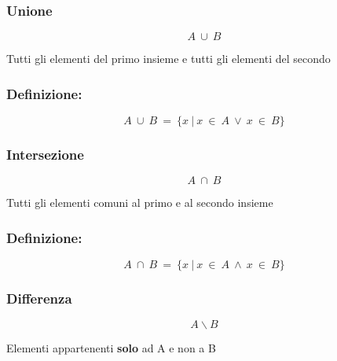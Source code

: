 \documentclass{article}
\begin{document}
    \subsubsection{Unione}
        \begin{LARGE}
            \begin{equation*}
                A\ \cup\ B
            \end{equation*}
        \end{LARGE}
        Tutti gli elementi del primo insieme e tutti gli elementi del secondo\newline
        
        \subsubsection*{Definizione:}
        
        \begin{LARGE}
            \begin{equation*}
                A\ \cup\ B\ =\ \{x\ |\ x\ \in\ A\ \vee\ x\ \in\ B\}
            \end{equation*}
        \end{LARGE}

        \subsubsection{Intersezione}
        \begin{LARGE}
            \begin{equation*}
                A\ \cap\ B
            \end{equation*}
        \end{LARGE}
        Tutti gli elementi comuni al primo e al secondo insieme\newline
        
        \subsubsection*{Definizione:}
        
        \begin{LARGE}
            \begin{equation*}
                A\ \cap\ B\ =\ \{x\ |\ x\ \in\ A\ \wedge\ x\ \in\ B\}
            \end{equation*}
        \end{LARGE}

        \subsubsection{Differenza}
        \begin{LARGE}
            \begin{equation*}
                A \backslash B
            \end{equation*}
        \end{LARGE}
        Elementi appartenenti \textbf{solo} ad A e non a B\newline
        
\end{document}
